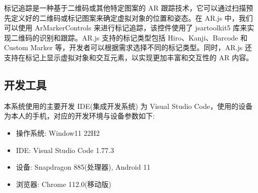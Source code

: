 标记追踪是一种基于二维码或其他特定图案的 AR 跟踪技术，它可以通过扫描预先定义好的二维码或标记图案来确定虚拟对象的位置和姿态。在 AR.js 中，我们可以使用 ArMarkerControls 来进行标记追踪，该控件使用了 jsartoolkit5 库来实现二维码的识别和跟踪。AR.js 支持的标记类型包括 Hiro、Kanji、Barcode 和 Custom Marker 等，开发者可以根据需求选择不同的标记类型。同时，AR.js 还支持在标记上显示虚拟对象和交互元素，以实现更加丰富和交互性的 AR 内容。

\subsection{开发工具}

本系统使用的主要开发 IDE(集成开发系统) 为 Visual Studio Code，使用的设备为本人的手机，对应的开发环境与设备参数如下:
\begin{itemize}
  \item 操作系统: Window11 22H2
  \item IDE: Visual Studio Code 1.77.3
  \item 设备: Snapdragon 885(处理器), Android 11
  \item 浏览器: Chrome 112.0(移动版)
\end{itemize}